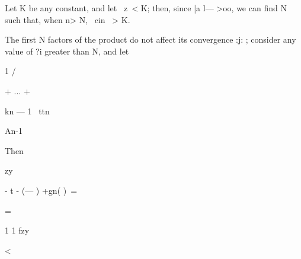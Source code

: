Let K be any constant, and let \ z\ < K; then, since |a l— >oo, we can 
find N such that, when n> N, \ cin \ >  K. 

The first N factors of the product do not affect its convergence :j: ; consider 
any value of ?i greater than N, and let 






1 /   



+ ... + 



kn — 1 \ ttn 



An-1 



Then 



zy 



- t - (— ) +gn( )\ = 



= 


1 1 fzy 


< 





